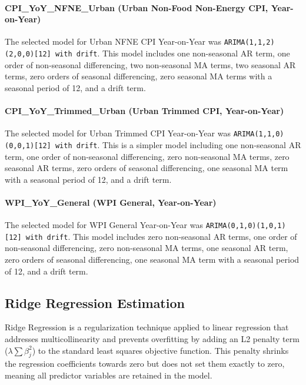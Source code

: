 \documentclass[12pt,a4paper]{article}
\begin{document}
\paragraph{CPI\_YoY\_NFNE\_Urban (Urban Non-Food Non-Energy CPI, Year-on-Year)}
The selected model for Urban NFNE CPI Year-on-Year was \texttt{ARIMA(1,1,2)(2,0,0)[12] with drift}. This model includes one non-seasonal AR term, one order of non-seasonal differencing, two non-seasonal MA terms, two seasonal AR terms, zero orders of seasonal differencing, zero seasonal MA terms with a seasonal period of 12, and a drift term.

\paragraph{CPI\_YoY\_Trimmed\_Urban (Urban Trimmed CPI, Year-on-Year)}
The selected model for Urban Trimmed CPI Year-on-Year was \texttt{ARIMA(1,1,0)(0,0,1)[12] with drift}. This is a simpler model including one non-seasonal AR term, one order of non-seasonal differencing, zero non-seasonal MA terms, zero seasonal AR terms, zero orders of seasonal differencing, one seasonal MA term with a seasonal period of 12, and a drift term.

\paragraph{WPI\_YoY\_General (WPI General, Year-on-Year)}
The selected model for WPI General Year-on-Year was \texttt{ARIMA(0,1,0)(1,0,1)[12] with drift}. This model includes zero non-seasonal AR terms, one order of non-seasonal differencing, zero non-seasonal MA terms, one seasonal AR term, zero orders of seasonal differencing, one seasonal MA term with a seasonal period of 12, and a drift term.


\subsection{Ridge Regression Estimation}
Ridge Regression is a regularization technique applied to linear regression that addresses multicollinearity and prevents overfitting by adding an L2 penalty term ($\lambda \sum \beta_j^2$) to the standard least squares objective function. This penalty shrinks the regression coefficients towards zero but does not set them exactly to zero, meaning all predictor variables are retained in the model.
\end{document}
